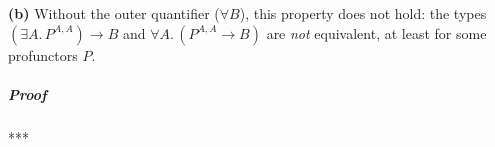 \textbf{(b)} Without the outer quantifier ($\forall B$), this property
does not hold: the types $(\exists A.\,P^{A,A})\rightarrow B$ and
$\forall A.\,(P^{A,A}\rightarrow B)$ are \emph{not} equivalent, at
least for some profunctors $P$.

\subparagraph{Proof}

{*}{*}{*}

\begin{comment}
jatin or the functional programming tutorial the focus of this chapter
is on three type constructions to begin let us consider the interpreter
pattern this is a design pattern where you present your program as
a data structure and you program an interpreter to run your data structure
so as an example consider this domain specific language for complex
numbers it\textsf{'}s a very simple language it has three operations to create
a complex number out of string to multiply complex numbers and to
compute the complex conjugate number if I want to represent this computation
as data in other words not to run it yet but to write down the operations
as data then I could imagine implementing it like this I can implement
some case classes in a disjunction like this so I have a program type
it has three parts of the disjunction which is either a string which
will represent this operation parsing a string into a complex number
multiplication of two complex numbers and computing the complex conjugate
number and then I can imagine that instead of this program I will
have a data structure with nested case classes like this in order
to be able to define such a data structure in my case classrooms should
have these types so for instance multiplication case class will contain
two parts and each can be itself another program so that\textsf{'}s why the
types of the parts of these schemes classes are again the type program
itself so in this way having defined these type parts of the case
class as programs I enable myself to write down arbitrary nested case
classes so this has type program I can use this as part of another
case class like MO or conjugate so in this way I have created a domain-specific
language that expresses computations with complex numbers as data
structures in order to actually compute anything with any complex
numbers I would need to run this program this dsl program as I would
say the interpreter will be a function of the type signature it may
be like this it will take an argument of type program and it will
return a pair of double numbers which would represent a complex number
that is the result of computing this program so why would you use

\end{comment}
